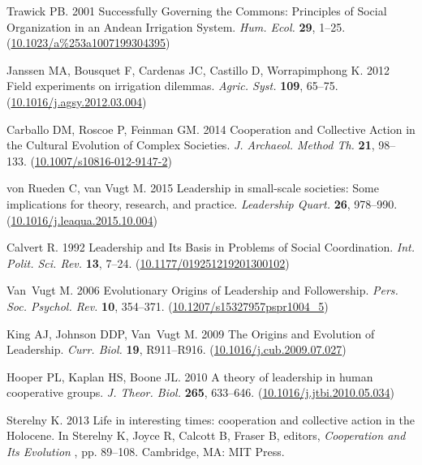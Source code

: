 \documentclass{rstb}
\begin{document}
\begin{thebibliography}{99}
Trawick PB. 2001  Successfully Governing the Commons: {Principles} of Social
  Organization in an {Andean} Irrigation System. {\em Hum. Ecol.}
  \textbf{29}, 1--25.
(\href{http://dx.doi.org/10.1023/a\%253a1007199304395}{10.1023/a\%253a1007199304395})

Janssen MA, Bousquet F, Cardenas JC, Castillo D, Worrapimphong K. 2012  Field
  experiments on irrigation dilemmas. {\em Agric. Syst.} \textbf{109}, 65--75.
(\href{http://dx.doi.org/10.1016/j.agsy.2012.03.004}{10.1016/j.agsy.2012.03.004})

Carballo DM, Roscoe P, Feinman GM. 2014  Cooperation and Collective Action in
  the Cultural Evolution of Complex Societies. {\em J. Archaeol. Method Th.} \textbf{21}, 98--133.
(\href{http://dx.doi.org/10.1007/s10816-012-9147-2}{10.1007/s10816-012-9147-2})

von Rueden C, van Vugt M. 2015  Leadership in small-scale societies: {Some}
  implications for theory, research, and practice. {\em Leadership
  Quart.} \textbf{26}, 978--990.
(\href{http://dx.doi.org/10.1016/j.leaqua.2015.10.004}{10.1016/j.leaqua.2015.10.004})

Calvert R. 1992  Leadership and Its Basis in Problems of Social Coordination.
  {\em Int. Polit. Sci. Rev.} \textbf{13}, 7--24.
(\href{http://dx.doi.org/10.1177/019251219201300102}{10.1177/019251219201300102})

Van~Vugt M. 2006  Evolutionary Origins of Leadership and Followership. {\em
  Pers. Soc. Psychol. Rev.} \textbf{10}, 354--371.
(\href{http://dx.doi.org/10.1207/s15327957pspr1004\_5}{10.1207/s15327957pspr1004\_5})

King AJ, Johnson DDP, Van~Vugt M. 2009  The Origins and Evolution of
  Leadership. {\em Curr. Biol.} \textbf{19}, R911--R916.
(\href{http://dx.doi.org/10.1016/j.cub.2009.07.027}{10.1016/j.cub.2009.07.027})

Hooper PL, Kaplan HS, Boone JL. 2010  A theory of leadership in human
  cooperative groups. {\em J. Theor. Biol.} \textbf{265}, 633--646.
(\href{http://dx.doi.org/10.1016/j.jtbi.2010.05.034}{10.1016/j.jtbi.2010.05.034})

Sterelny K. 2013  Life in interesting times: cooperation and collective action
  in the Holocene. In Sterelny K, Joyce R, Calcott B, Fraser B, editors, {\em
  Cooperation and Its Evolution} ,  pp. 89--108. Cambridge, MA: MIT Press.


\end{thebibliography}
\end{document}
